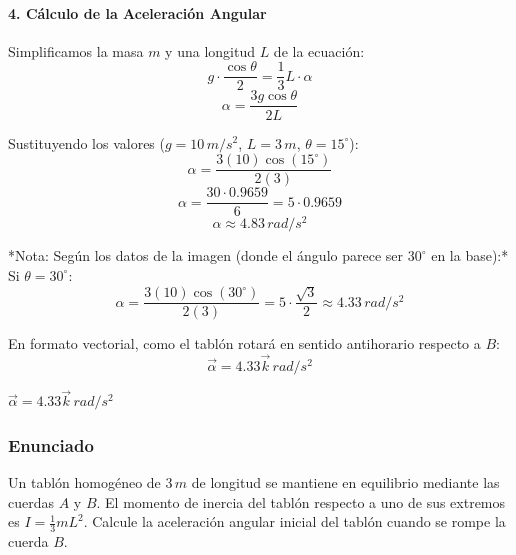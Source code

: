 \documentclass[12pt, a4paper]{article}
\begin{document}
\paragraph{4. Cálculo de la Aceleración Angular}
Simplificamos la masa $m$ y una longitud $L$ de la ecuación:
$$ g \cdot \frac{\cos \theta}{2} = \frac{1}{3} L \cdot \alpha $$
$$ \alpha = \frac{3 g \cos \theta}{2 L} $$

Sustituyendo los valores ($g = 10 \, \si{m/s^2}$, $L = 3 \, \si{m}$, $\theta = 15^\circ$):
$$ \alpha = \frac{3(10) \cos(15^\circ)}{2(3)} $$
$$ \alpha = \frac{30 \cdot 0.9659}{6} = 5 \cdot 0.9659 $$
$$ \alpha \approx 4.83 \, \si{rad/s^2} $$

*Nota: Según los datos de la imagen (donde el ángulo parece ser $30^\circ$ en la base):*
Si $\theta = 30^\circ$:
$$ \alpha = \frac{3(10) \cos(30^\circ)}{2(3)} = 5 \cdot \frac{\sqrt{3}}{2} \approx 4.33 \, \si{rad/s^2} $$

En formato vectorial, como el tablón rotará en sentido antihorario respecto a $B$:
$$ \vec{\alpha} = 4.33\vec{k} \, \si{rad/s^2} $$

\begin{tcolorbox}[colback=green!5!white, colframe=green!50!black, title=Respuesta Final]
\centering \Large $\vec{\alpha} = 4.33\vec{k} \, \si{rad/s^2}$
\end{tcolorbox}

\newpage

\subsubsection*{Enunciado}
Un tablón homogéneo de $3 \, \si{m}$ de longitud se mantiene en equilibrio mediante las cuerdas $A$ y $B$. El momento de inercia del tablón respecto a uno de sus extremos es $I = \frac{1}{3} m L^2$. Calcule la aceleración angular inicial del tablón cuando se rompe la cuerda $B$.

\begin{center}
\end{center}
\end{document}
